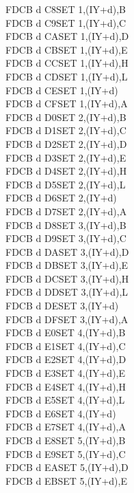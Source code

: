 \documentclass[12pt,twoside,openright,a4paper]{book}
\begin{document}
\begin{multicols}{3}
{\begin{tabbing}
	FDCB d C8\>SET 1,(IY+d),B\UNDOC\\
	FDCB d C9\>SET 1,(IY+d),C\UNDOC\\
	FDCB d CA\>SET 1,(IY+d),D\UNDOC\\
	FDCB d CB\>SET 1,(IY+d),E\UNDOC\\
	FDCB d CC\>SET 1,(IY+d),H\UNDOC\\
	FDCB d CD\>SET 1,(IY+d),L\UNDOC\\
	FDCB d CE\>SET 1,(IY+d)\\
	FDCB d CF\>SET 1,(IY+d),A\UNDOC\\
	FDCB d D0\>SET 2,(IY+d),B\UNDOC\\
	FDCB d D1\>SET 2,(IY+d),C\UNDOC\\
	FDCB d D2\>SET 2,(IY+d),D\UNDOC\\
	FDCB d D3\>SET 2,(IY+d),E\UNDOC\\
	FDCB d D4\>SET 2,(IY+d),H\UNDOC\\
	FDCB d D5\>SET 2,(IY+d),L\UNDOC\\
	FDCB d D6\>SET 2,(IY+d)\\
	FDCB d D7\>SET 2,(IY+d),A\UNDOC\\
	FDCB d D8\>SET 3,(IY+d),B\UNDOC\\
	FDCB d D9\>SET 3,(IY+d),C\UNDOC\\
	FDCB d DA\>SET 3,(IY+d),D\UNDOC\\
	FDCB d DB\>SET 3,(IY+d),E\UNDOC\\
	FDCB d DC\>SET 3,(IY+d),H\UNDOC\\
	FDCB d DD\>SET 3,(IY+d),L\UNDOC\\
	FDCB d DE\>SET 3,(IY+d)\\
	FDCB d DF\>SET 3,(IY+d),A\UNDOC\\
	FDCB d E0\>SET 4,(IY+d),B\UNDOC\\
	FDCB d E1\>SET 4,(IY+d),C\UNDOC\\
	FDCB d E2\>SET 4,(IY+d),D\UNDOC\\
	FDCB d E3\>SET 4,(IY+d),E\UNDOC\\
	FDCB d E4\>SET 4,(IY+d),H\UNDOC\\
	FDCB d E5\>SET 4,(IY+d),L\UNDOC\\
	FDCB d E6\>SET 4,(IY+d)\\
	FDCB d E7\>SET 4,(IY+d),A\UNDOC\\
	FDCB d E8\>SET 5,(IY+d),B\UNDOC\\
	FDCB d E9\>SET 5,(IY+d),C\UNDOC\\
	FDCB d EA\>SET 5,(IY+d),D\UNDOC\\
	FDCB d EB\>SET 5,(IY+d),E\UNDOC\\

\end{tabbing}}
\end{multicols}
\end{document}
